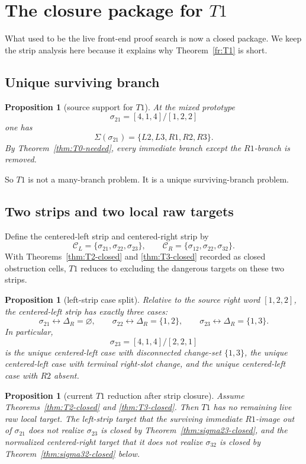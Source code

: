 \documentclass[11pt]{article}
\newtheorem{proposition}[theorem]{Proposition}
\newcommand{\sig}[2]{\sigma_{#1#2}}
\newcommand{\CL}{\mathcal C_L}
\newcommand{\CR}{\mathcal C_R}
\begin{document}
\section{\texorpdfstring{The closure package for \(T1\)}{The closure package for T1}}

What used to be the live front-end proof search is now a closed package.
We keep the strip analysis here because it explains why Theorem~\ref{fr:T1} is
short.

\subsection{Unique surviving branch}

\begin{proposition}[source support for \(T1\)]
\label{prop:T1-source-support}
At the mixed prototype
\[
\sig21=[4,1,4]/[1,2,2]
\]
one has
\[
\Sigma(\sig21)=\{L2,L3,R1,R2,R3\}.
\]
By Theorem~\ref{thm:T0-needed}, every immediate branch except the
\(R1\)-branch is removed.
\end{proposition}

So \(T1\) is not a many-branch problem.
It is a unique surviving-branch problem.

\subsection{Two strips and two local raw targets}

Define the centered-left strip and centered-right strip by
\[
\CL=\{\sig21,\sig22,\sig23\},
\qquad
\CR=\{\sig12,\sig22,\sig32\}.
\]
With Theorems~\ref{thm:T2-closed} and \ref{thm:T3-closed} recorded as
closed obstruction cells, \(T1\) reduces to excluding the dangerous targets
on these two strips.

\begin{proposition}[left-strip case split]
\label{prop:left-strip-case-split}
Relative to the source right word \([1,2,2]\), the centered-left strip has
exactly three cases:
\[
\sig21 \leftrightarrow \Delta_R=\varnothing,\qquad
\sig22 \leftrightarrow \Delta_R=\{1,2\},\qquad
\sig23 \leftrightarrow \Delta_R=\{1,3\}.
\]
In particular,
\[
\sig23=[4,1,4]/[2,2,1]
\]
is the unique centered-left case with disconnected change-set \(\{1,3\}\), the
unique centered-left case with terminal right-slot change, and the unique
centered-left case with \(R2\) absent.
\end{proposition}

\begin{proposition}[current \(T1\) reduction after strip closure]
\label{prop:T1-current-reduction}
Assume Theorems~\ref{thm:T2-closed} and \ref{thm:T3-closed}.
Then \(T1\) has no remaining live raw local target.
The left-strip target that the surviving immediate \(R1\)-image out of
\(\sig21\) does not realize \(\sig23\) is closed by
Theorem~\ref{thm:sigma23-closed}, and the normalized centered-right target that
it does not realize \(\sig32\) is closed by
Theorem~\ref{thm:sigma32-closed} below.
\end{proposition}
\end{document}
